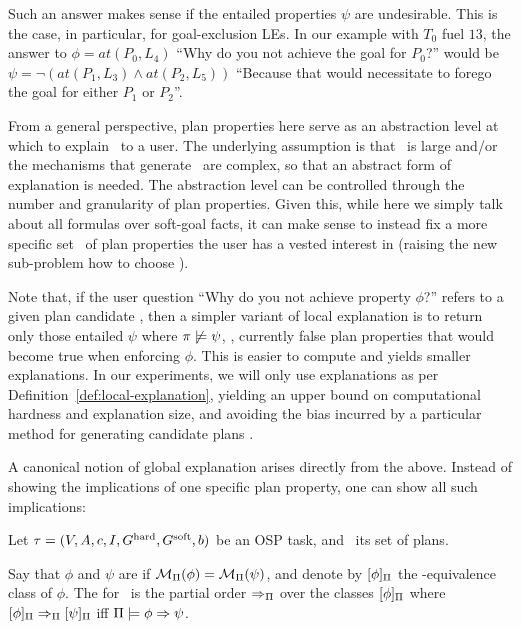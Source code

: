 Such an answer makes sense if the entailed properties $\psi$ are
undesirable. This is the case, in particular, for goal-exclusion
LEs. In our example with $T_0$ fuel $13$, the answer to $\phi =
at(P_0,L_4)$ ``Why do you not achieve the goal for $P_0$?'' would be
$\psi = \neg (at(P_1,L_3) \wedge at(P_2,L_5))$ ``Because that would
necessitate to forego the goal for either $P_1$ or $P_2$''.

From a general perspective, plan properties here serve as an
abstraction level at which to explain \plans\ to a user. The
underlying assumption is that \plans\ is large and/or the mechanisms
that generate \plans\ are complex, so that an abstract form of
explanation is needed. The abstraction level can be controlled through
the number and granularity of plan properties. Given this, while here
we simply talk about all formulas over soft-goal facts, it can make
sense to instead fix a more specific set \props\ of plan properties
the user has a vested interest in (raising the new sub-problem how to
choose \props).

Note that, if the user question ``Why do you not achieve property
$\phi$?''  refers to a given plan candidate \plan, then a simpler
variant of local explanation is to return only those entailed $\psi$
where $\pi \not\models \psi$, \ie, currently false plan properties
that would become true when enforcing $\phi$. This is easier to
compute and yields smaller explanations. In our experiments, we will
only use explanations as per Definition~\ref{def:local-explanation},
yielding an upper bound on computational hardness and explanation
size, and avoiding the bias incurred by a particular method for
generating candidate plans \plan.

A canonical notion of global explanation arises directly from the
above.  Instead of showing the implications of one specific plan
property, one can show all such implications:

\begin{definition}
Let $\tau =
(V,\allowbreak A,\allowbreak{\ensuremath{c}},\allowbreak I,\allowbreak G^{\text{\textup{hard}}},\allowbreak G^{\text{\textup{soft}}},\allowbreak{\ensuremath{b}})$
be an OSP task, and \plans\ its set of plans.

Say that $\phi$ and $\psi$ are  if
${\cal M}_{\Pi}(\phi) = {\cal M}_{\Pi}(\psi)$, and denote by
$[\phi]_{\Pi}$ the \plans-equivalence class of $\phi$.
%
The  for \task\ is the partial order
$\Rightarrow_{\Pi}$ over the classes $[\phi]_{\Pi}$ where
$[\phi]_{\Pi} \Rightarrow_{\Pi} [\psi]_{\Pi}$ iff
$\Pi \models \phi \Rightarrow \psi$.
%
\end{definition}

